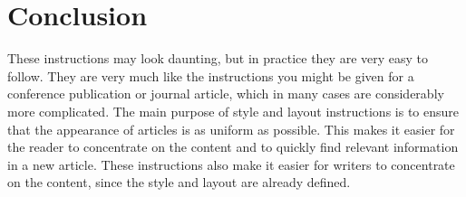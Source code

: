 \section{Conclusion}\label{sec:conclusion}
These instructions may look daunting, but in practice they are very easy to follow. They are very much like the instructions you might be given for a conference publication or journal article,  which in many cases are considerably more complicated. The main purpose of style and layout instructions is to ensure that the appearance of articles is as uniform as possible. This makes it easier for the reader to concentrate on the content and to quickly find relevant information in a new article. These instructions also make it easier for writers to concentrate on the content, since the style and layout are already defined.
